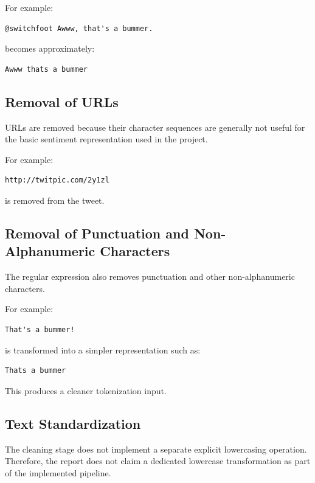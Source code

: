 \documentclass[12pt,a4paper]{article}
\begin{document}
For example:

\begin{lstlisting}
@switchfoot Awww, that's a bummer.
\end{lstlisting}

becomes approximately:

\begin{lstlisting}
Awww thats a bummer
\end{lstlisting}

\subsection{Removal of URLs}

URLs are removed because their character sequences are generally not useful for the basic sentiment representation used in the project.

For example:

\begin{lstlisting}
http://twitpic.com/2y1zl
\end{lstlisting}

is removed from the tweet.

\subsection{Removal of Punctuation and Non-Alphanumeric Characters}

The regular expression also removes punctuation and other non-alphanumeric characters.

For example:

\begin{lstlisting}
That's a bummer!
\end{lstlisting}

is transformed into a simpler representation such as:

\begin{lstlisting}
Thats a bummer
\end{lstlisting}

This produces a cleaner tokenization input.

\subsection{Text Standardization}

The cleaning stage does not implement a separate explicit lowercasing operation. Therefore, the report does not claim a dedicated lowercase transformation as part of the implemented pipeline.
\end{document}
